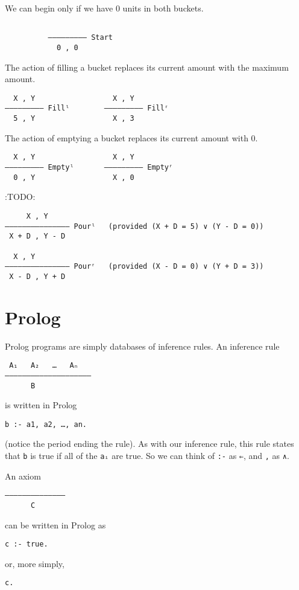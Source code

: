 \documentclass[11pt]{article}
\begin{document}
We can begin only if we have 0 units in both buckets.
\begin{verbatim}

          ––––––––— Start
            0 , 0
\end{verbatim}

The action of filling a bucket replaces its current amount
with the maximum amount.
\begin{verbatim}
  X , Y                  X , Y
––––––––— Fillˡ        ––––––––– Fillʳ
  5 , Y                  X , 3
\end{verbatim}

The action of emptying a bucket replaces its current amount
with 0.
\begin{verbatim}
  X , Y                  X , Y
––––––––— Emptyˡ       ––––––––– Emptyʳ
  0 , Y                  X , 0  
\end{verbatim}

:TODO:
\begin{verbatim}
     X , Y        
–—–––––––————–– Pourˡ   (provided (X + D = 5) ∨ (Y - D = 0))
 X + D , Y - D

  X , Y        
––––––––––––––— Pourʳ   (provided (X - D = 0) ∨ (Y + D = 3))
 X - D , Y + D
\end{verbatim}

\section{Prolog}
\label{sec:org7111e3f}
Prolog programs are simply databases of inference rules.
An inference rule
\begin{verbatim}
 A₁   A₂   …   Aₙ
––––––––––––––––––––
      B
\end{verbatim}
is written in Prolog
\begin{verbatim}
b :- a1, a2, …, an.
\end{verbatim}
(notice the period ending the rule).
As with our inference rule, this rule states that
\texttt{b} is true if all of the \texttt{aᵢ} are true.
So we can think of \texttt{:-} as \texttt{⇐}, and \texttt{,} as \texttt{∧}.

An axiom
\begin{verbatim}
––––––––––––––
      C
\end{verbatim}
can be written in Prolog as
\begin{verbatim}
c :- true.
\end{verbatim}
or, more simply,
\begin{verbatim}
c.
\end{verbatim}
\end{document}
